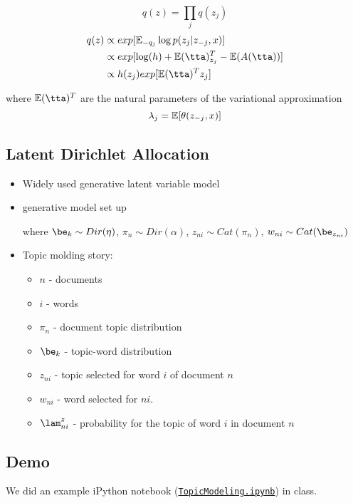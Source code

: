 \documentclass{article}
\begin{document}
\[ q(z) = \prod_j q(z_j)\]
\begin{align*}
q(z) &\propto exp[\E_{-q_j} \log p(z_j|z_{-j},x)] \\
&\propto exp[ \log(h) + \E(\tta)_{z_j}^T - \E (A(\tta))] \\
&\propto h(z_j) exp[\E(\tta)^T z_j]
\end{align*}

where $\E(\tta)^T$ are the natural parameters of the variational approximation \newline
\[\lambda_j = \mathbb{E}[\theta(z_{-j},x)]\]

\subsection{Latent Dirichlet Allocation}
\begin{itemize}
\item Widely used generative latent variable model
\item generative model set up
\begin{center}
\end{center}
where $\be_k \sim Dir(\eta)$, $\pi_n \sim Dir(\alpha)$, $z_{ni} \sim Cat(\pi_n)$, $w_{ni} \sim Cat(\be_{z_{ni}})$
\item Topic molding story: 
\begin{itemize}
\item $n$ - documents
\item $i$ - words
\item $\pi_n$ - document topic distribution
\item $\be_k$ - topic-word distribution
\item $z_{ni}$ - topic selected for word $i$ of document $n$ 
\item $w_{ni}$ - word selected for $ni$. 
\item $\lam_{ni}^z$ - probability for the topic of word $i$ in document $n$
\end{itemize}
 


\end{itemize}

\subsection{Demo}

\smallskip
We did an example iPython notebook (\href{https://github.com/harvard-ml-courses/cs281-demos/blob/master/TopicModeling.ipynb}{\texttt{TopicModeling.ipynb}}) in class.
\end{document}
